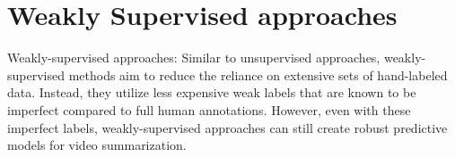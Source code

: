 \section{Weakly Supervised approaches}
\label{section:rel-weakly}

Weakly-supervised approaches: Similar to unsupervised approaches, weakly-supervised methods aim to reduce the reliance on extensive sets of hand-labeled data. Instead, they utilize less expensive weak labels that are known to be imperfect compared to full human annotations. However, even with these imperfect labels, weakly-supervised approaches can still create robust predictive models for video summarization.

